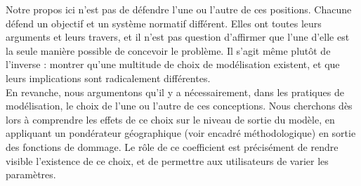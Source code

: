 Notre propos ici n'est pas de défendre l'une ou l'autre de ces positions. Chacune défend un objectif et un système normatif différent. Elles ont toutes leurs arguments et leurs travers, et il n'est pas question d'affirmer que l'une d'elle est la seule manière possible de concevoir le problème. Il s'agit même plutôt de l'inverse : montrer qu'une multitude de choix de modélisation existent, et que leurs implications sont radicalement différentes. \\

En revanche, nous argumentons qu'il y a nécessairement, dans les pratiques de modélisation, le choix de l'une ou l'autre de ces conceptions.  Nous cherchons dès lors à comprendre les effets de ce choix sur le niveau de sortie du modèle, en appliquant un pondérateur géographique (voir encadré méthodologique) en sortie des fonctions de dommage. Le rôle de ce coefficient est précisément de  rendre visible l'existence de ce choix, et de permettre aux utilisateurs de varier les paramètres. 

